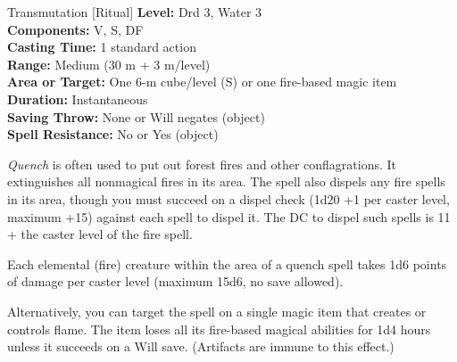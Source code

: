 {Transmutation [Ritual]}
{
	\textbf{Level:}
	Drd 3, Water 3\\
	\textbf{Components:}
	V, S, DF\\
	\textbf{Casting Time:}
	1 standard action\\
	\textbf{Range:}
	Medium (30 m + 3 m/level)\\
	\textbf{Area or Target:}
	One 6-m cube/level (S) or one fire-based magic item\\
	\textbf{Duration:}
	Instantaneous\\
	\textbf{Saving Throw:}
	None or Will negates (object)\\
	\textbf{Spell Resistance:}
	No or Yes (object)\\
}
{
	\emph{Quench} is often used to put out forest fires and other conflagrations. It extinguishes all nonmagical fires in its area. The spell also dispels any fire spells in its area, though you must succeed on a dispel check (1d20 +1 per caster level, maximum +15) against each spell to dispel it. The DC to dispel such spells is 11 + the caster level of the fire spell.

	Each elemental (fire) creature within the area of a quench spell takes 1d6 points of damage per caster level (maximum 15d6, no save allowed).

	Alternatively, you can target the spell on a single magic item that creates or controls flame. The item loses all its fire-based magical abilities for 1d4 hours unless it succeeds on a Will save. (Artifacts are immune to this effect.)

}
